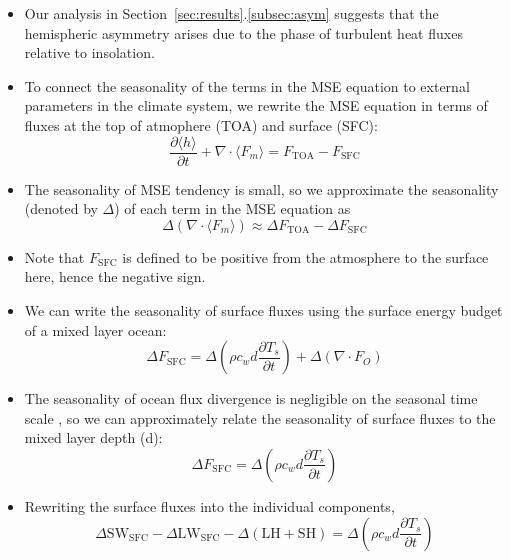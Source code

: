 \documentclass{ametsocV5}
\begin{document}
\appendix[B]
  \begin{itemize}
  \item Our analysis in Section~\ref{sec:results}.\ref{subsec:asym} suggests that the hemispheric asymmetry arises due to the phase of turbulent heat fluxes relative to insolation.
  \item To connect the seasonality of the terms in the MSE equation to external parameters in the climate system, we rewrite the MSE equation in terms of fluxes at the top of atmophere (TOA) and surface (SFC):
        \begin{equation}\label{eq:mse-toasfc}
          \frac{\partial \langle h \rangle}{\partial t} + \nabla\cdot \langle F_{m} \rangle = F_{\mathrm{TOA}} - F_{\mathrm{SFC}}
        \end{equation}
  \item The seasonality of MSE tendency is small, so we approximate the seasonality (denoted by $\Delta$) of each term in the MSE equation as
        \begin{equation}\label{eq:mse-toasfc-approx}
          \Delta (\nabla\cdot \langle F_{m} \rangle) \approx \Delta F_{\mathrm{TOA}} - \Delta F_{\mathrm{SFC}}
        \end{equation}
  \item Note that \(F_{\mathrm{SFC}}\) is defined to be positive from the atmosphere to the surface here, hence the negative sign.
  \item We can write the seasonality of surface fluxes using the surface energy budget of a mixed layer ocean:
        \begin{equation}
          \Delta F_{\mathrm{SFC}} = \Delta\left(\rho c_{w} d \frac{\partial T_{s}}{\partial t}\right) + \Delta ( \nabla\cdot F_{O})
        \end{equation}
  \item The seasonality of ocean flux divergence is negligible on the seasonal time scale \citep{roberts2017}, so we can approximately relate the seasonality of surface fluxes to the mixed layer depth (d):
        \begin{equation} \label{eq:sfc-simple}
          \Delta F_{\mathrm{SFC}} = \Delta\left(\rho c_{w} d \frac{\partial T_{s}}{\partial t}\right)
        \end{equation}
  \item Rewriting the surface fluxes into the individual components,
        \begin{equation} \label{eq:sfc}
          \Delta \mathrm{SW}_{\mathrm{SFC}} - \Delta\mathrm{LW}_{\mathrm{SFC}} - \Delta(\mathrm{LH + SH}) = \Delta\left(\rho c_{w} d \frac{\partial T_{s}}{\partial t}\right)

\end{equation}
\end{itemize}
\end{document}
